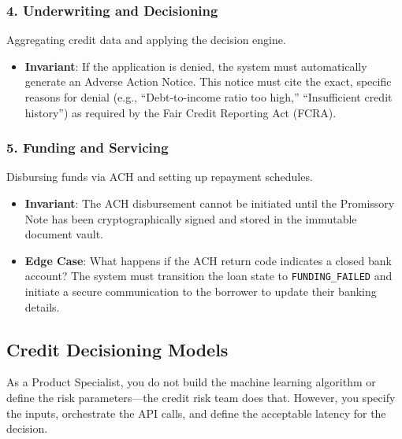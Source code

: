 \subsubsection{4. Underwriting and
Decisioning}\label{underwriting-and-decisioning}

Aggregating credit data and applying the decision engine.

\begin{itemize}
\tightlist
\item
  \textbf{Invariant}: If the application is denied, the system must
  automatically generate an Adverse Action Notice. This notice must cite
  the exact, specific reasons for denial (e.g., ``Debt-to-income ratio
  too high,'' ``Insufficient credit history'') as required by the Fair
  Credit Reporting Act (FCRA).
\end{itemize}

\subsubsection{5. Funding and Servicing}\label{funding-and-servicing}

Disbursing funds via ACH and setting up repayment schedules.

\begin{itemize}
\tightlist
\item
  \textbf{Invariant}: The ACH disbursement cannot be initiated until the
  Promissory Note has been cryptographically signed and stored in the
  immutable document vault.
\item
  \textbf{Edge Case}: What happens if the ACH return code indicates a
  closed bank account? The system must transition the loan state to
  \texttt{FUNDING\_FAILED} and initiate a secure communication to the
  borrower to update their banking details.
\end{itemize}

\subsection{Credit Decisioning Models}\label{credit-decisioning-models}

As a Product Specialist, you do not build the machine learning algorithm
or define the risk parameters---the credit risk team does that. However,
you specify the inputs, orchestrate the API calls, and define the
acceptable latency for the decision.

